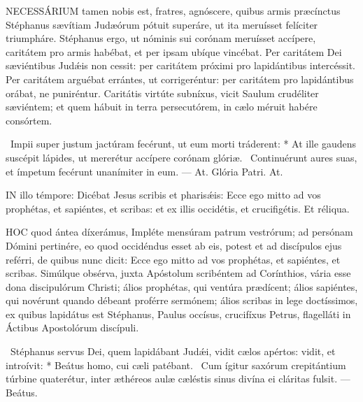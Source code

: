 \lettrine[lines=2]{N}{ECESSÁRIUM} tamen nobis est, fratres, agnóscere, quibus armis præcínctus Stéphanus sævítiam Judæórum pótuit superáre, ut ita meruísset felíciter triumpháre. Stéphanus ergo, ut nóminis sui corónam meruísset accípere, caritátem pro armis habébat, et per ipsam ubíque vincébat. Per caritátem Dei sæviéntibus Judǽis non cessit: per caritátem próximi pro lapidántibus intercéssit. Per caritátem arguébat errántes, ut corrigeréntur: per caritátem pro lapidántibus orábat, ne puniréntur. Caritátis virtúte subníxus, vicit Saulum crudéliter sæviéntem; et quem hábuit in terra persecutórem, in cælo méruit habére consórtem.

\R\ Impii super justum jactúram fecérunt, ut eum morti tráderent: * At ille gaudens suscépit lápides, ut mererétur accípere corónam glóriæ. \V\ Continuérunt aures suas, et ímpetum fecérunt unanímiter in eum. --- At. Glória Patri. At.




\lettrine[lines=2]{I}{N} illo témpore: Dicébat Jesus scribis et pharisǽis: Ecce ego mitto ad vos prophétas, et sapiéntes, et scribas: et ex illis occidétis, et crucifigétis. Et réliqua.



\lettrine[lines=2]{H}{OC} quod ántea díxerámus, Impléte mensúram patrum vestrórum; ad persónam Dómini pertinére, eo quod occidéndus esset ab eis, potest et ad discípulos ejus reférri, de quibus nunc dicit: Ecce ego mitto ad vos prophétas, et sapiéntes, et scribas. Simúlque obsérva, juxta Apóstolum scribéntem ad Corínthios, vária esse dona discipulórum Christi; álios prophétas, qui ventúra prædícent; álios sapiéntes, qui novérunt quando débeant proférre sermónem; álios scribas in lege doctíssimos, ex quibus lapidátus est Stéphanus, Paulus occísus, crucifíxus Petrus, flagelláti in Áctibus Apostolórum discípuli.

\R\ Stéphanus servus Dei, quem lapidábant Judǽi, vidit cælos apértos: vidit, et introívit: * Beátus homo, cui cæli patébant. \V\ Cum ígitur saxórum crepitántium túrbine quaterétur, inter æthéreos aulæ cæléstis sinus divína ei cláritas fulsit. --- Beátus.



